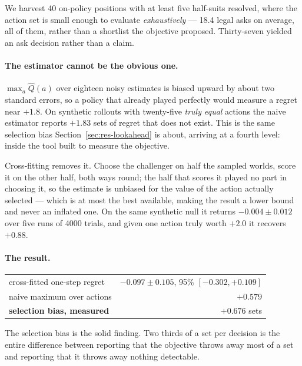 \documentclass[11pt,a4paper]{article}
\begin{document}
We harvest 40 on-policy positions with at least five half-suits resolved, where
the action set is small enough to evaluate \emph{exhaustively} --- 18.4 legal
asks on average, all of them, rather than a shortlist the objective proposed.
Thirty-seven yielded an ask decision rather than a claim.

\paragraph{The estimator cannot be the obvious one.} $\max_a \widehat{Q}(a)$ over
eighteen noisy estimates is biased upward by about two standard errors, so a
policy that already played perfectly would measure a regret near $+1.8$. On
synthetic rollouts with twenty-five \emph{truly equal} actions the naive
estimator reports $+1.83$ sets of regret that does not exist. This is the same
selection bias Section~\ref{sec:res-lookahead} is about, arriving at a fourth
level: inside the tool built to measure the objective.

Cross-fitting removes it. Choose the challenger on half the sampled worlds,
score it on the other half, both ways round; the half that scores it played no
part in choosing it, so the estimate is unbiased for the value of the action
actually selected --- which is at most the best available, making the result a
lower bound and never an inflated one. On the same synthetic null it returns
$-0.004 \pm 0.012$ over five runs of 4000 trials, and given one action truly
worth $+2.0$ it recovers $+0.88$.

\paragraph{The result.}

\begin{center}
\small
\begin{tabular}{lr}
\toprule
cross-fitted one-step regret & $-0.097 \pm 0.105$, 95\% $[-0.302, +0.109]$ \\
naive maximum over actions   & $+0.579$ \\
\textbf{selection bias, measured} & $\mathbf{+0.676}$ sets \\
\bottomrule
\end{tabular}
\end{center}

The selection bias is the solid finding. Two thirds of a set per decision is the
entire difference between reporting that the objective throws away most of a set
and reporting that it throws away nothing detectable.
\end{document}
